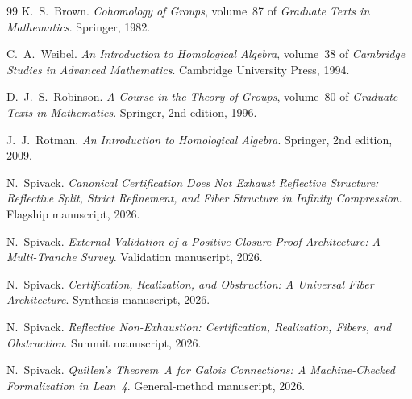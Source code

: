 \documentclass[11pt]{article}
\begin{document}
\begin{thebibliography}{99}
K.~S.~Brown.
\newblock \emph{Cohomology of Groups}, volume~87 of \emph{Graduate Texts in
  Mathematics}.
\newblock Springer, 1982.

C.~A.~Weibel.
\newblock \emph{An Introduction to Homological Algebra}, volume~38 of
  \emph{Cambridge Studies in Advanced Mathematics}.
\newblock Cambridge University Press, 1994.

D.~J.~S.~Robinson.
\newblock \emph{A Course in the Theory of Groups}, volume~80 of \emph{Graduate
  Texts in Mathematics}.
\newblock Springer, 2nd edition, 1996.

J.~J.~Rotman.
\newblock \emph{An Introduction to Homological Algebra}.
\newblock Springer, 2nd edition, 2009.

N.~Spivack.
\newblock \emph{Canonical Certification Does Not Exhaust Reflective Structure:
  Reflective Split, Strict Refinement, and Fiber Structure in Infinity Compression}.
\newblock Flagship manuscript, 2026.

N.~Spivack.
\newblock \emph{External Validation of a Positive-Closure Proof Architecture:
  A Multi-Tranche Survey}.
\newblock Validation manuscript, 2026.

N.~Spivack.
\newblock \emph{Certification, Realization, and Obstruction: A Universal Fiber Architecture}.
\newblock Synthesis manuscript, 2026.

N.~Spivack.
\newblock \emph{Reflective Non-Exhaustion: Certification, Realization, Fibers, and Obstruction}.
\newblock Summit manuscript, 2026.

N.~Spivack.
\newblock \emph{Quillen's Theorem~A for Galois Connections: A Machine-Checked
  Formalization in Lean~4}.
\newblock General-method manuscript, 2026.

\end{thebibliography}
\end{document}
